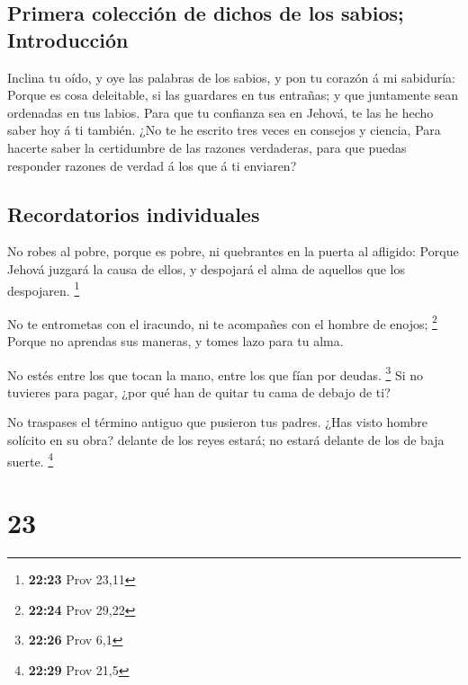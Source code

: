 \hypertarget{primera-colecciuxf3n-de-dichos-de-los-sabios-introducciuxf3n}{%
\subsection{Primera colección de dichos de los sabios;
Introducción}\label{primera-colecciuxf3n-de-dichos-de-los-sabios-introducciuxf3n}}

 Inclina tu oído, y oye las palabras de los sabios, y pon
tu corazón á mi sabiduría:  Porque es cosa deleitable, si
las guardares en tus entrañas; y que juntamente sean ordenadas en tus
labios.  Para que tu confianza sea en Jehová, te las he
hecho saber hoy á ti también.  ¿No te he escrito tres
veces en consejos y ciencia,  Para hacerte saber la
certidumbre de las razones verdaderas, para que puedas responder razones
de verdad á los que á ti enviaren?

\hypertarget{recordatorios-individuales}{%
\subsection{Recordatorios
individuales}\label{recordatorios-individuales}}

 No robes al pobre, porque es pobre, ni quebrantes en la
puerta al afligido:  Porque Jehová juzgará la causa de
ellos, y despojará el alma de aquellos que los despojaren. \footnote{\textbf{22:23}
  Prov 23,11}

 No te entrometas con el iracundo, ni te acompañes con el
hombre de enojos; \footnote{\textbf{22:24} Prov 29,22} 
Porque no aprendas sus maneras, y tomes lazo para tu alma.

 No estés entre los que tocan la mano, entre los que fían
por deudas. \footnote{\textbf{22:26} Prov 6,1}  Si no
tuvieres para pagar, ¿por qué han de quitar tu cama de debajo de ti?

 No traspases el término antiguo que pusieron tus padres.
 ¿Has visto hombre solícito en su obra? delante de los
reyes estará; no estará delante de los de baja suerte. \footnote{\textbf{22:29}
  Prov 21,5}

\hypertarget{section-22}{%
\section{23}\label{section-22}}

